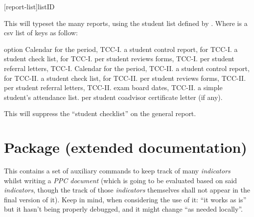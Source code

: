 \documentclass[article,nofontwarning,nogeometry,english,tocdepth=3,secdepth=3]{ufrgscca} %
\begin{document}
 
\begin{codedescribe}{\tcreports}
	\begin{codesyntax}%
		\tsmacro{\tcreports}[report-list]{listID}
	\end{codesyntax}
	This will typeset the many reports, using the student list defined by \tsobj[meta]{listID}.
    Where  is a csv list of keys as follow:
\end{codedescribe}

\begin{describelist}{option}
	 { Calendar for the period, TCC-I.}
	 { a student control report, for TCC-I.}
	 { a student check list, for TCC-I.}
	 { per student reviews forms, TCC-I.}
	 { per student referral letters, TCC-I.}
	 { Calendar for the period, TCC-II.}
	 { a student control report, for TCC-II.}
	 { a student check list, for TCC-II.}
	 { per student reviews forms, TCC-II.}
	 { per student referral letters, TCC-II.}
	 { exam board dates, TCC-II.}
	 { a simple student's attendance list.}
	 { per student coadvisor certificate letter (if any).}
\end{describelist}

\begin{codedescribe}[code,new=2024/02/18]{\suppresschecklist}
	\begin{codesyntax}%
		\tsmacro{\suppresschecklist}{}
	\end{codesyntax}
	This will suppress the “student checklist” on the general report.
\end{codedescribe}

\section{ Package (extended documentation)}
This contains a set of auxiliary commands to keep track of many \emph{indicators} whilst writing  a \emph{PPC document} (which is going to be evaluated based on said \emph{indicators}, though the track of those \emph{indicators} themselves shall not appear in the final version of it). Keep in mind, when considering the use of it: “it works as is” but it hasn't being properly debugged, and it might change “as needed locally”.
\end{document}

